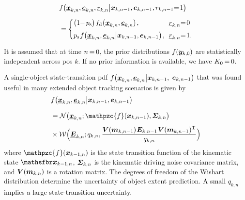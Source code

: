 \documentclass[10pt, twoside, romanappendices]{IEEEtran}
\providecommand{\rd}{\textcolor{black}}
\providecommand{\ist}{\hspace*{.3mm}}
\providecommand{\rmv}{\hspace*{-.3mm}}
\providecommand{\nn}{\nonumber}
\newcommand{\T}{\text{T}}
\begin{document}
\begin{align}
&f\big( \underline{\V{x}}_{k,n},  \underline{\V{e}}_{k,n}, \underline{r}_{k,n} \big| \V{x}_{k,n-1}, \V{e}_{k,n-1}, r_{k,n-1} \!\rmv=\! 1 \big) \nn\\[1.5mm]
&\hspace{0mm}=  
   \begin{cases}
		\big( 1 \!\rmv-\rmv p_{\mathrm{s}} \big) \ist f_{\mathrm{d}}\big( \underline{\V{x}}_{k,n}, \underline{\V{e}}_{k,n} \big) \ist, & \!\!\underline{r}_{k,n} \!\rmv=\! 0 \\[1.5mm] 
		p_{\mathrm{s}} \ist f\big( \underline{\V{x}}_{k,n}, \underline{\V{e}}_{k,n} \big| \V{x}_{k,n-1}, \V{e}_{k,n-1}\big) \ist, & \!\!\underline{r}_{k,n} \!\rmv=\! 1.
   \end{cases} \label{eq:singleTargetStateTrans_1}\\[-.5mm]
    \nn\\[-9.5mm]
\nn
\end{align}
It is assumed that at time $n \rmv=\rmv 0$, the prior distributions $f(\bm{y}_{k,0})$ are statistically independent across \acp{po} $k$. If no prior information is available, we have $K_0 \rmv=\rmv 0$.

A single-object state-transition pdf $f\big( \underline{\bm{x}}_{k,n}, \underline{\bm{e}}_{k,n} \big| \bm{x}_{k,n-1},$ $\bm{e}_{k,n-1}\big)$ that was found useful in many extended object tracking scenarios is given by \cite{GraOrg:J14a} 
\begin{align}
& f\big( \underline{\V{x}}_{k,n},  \underline{\V{e}}_{k,n} \big|\V{x}_{k,n-1}, \V{e}_{k,n-1} \big) \nn\\[2.5mm]
&= \Set{N}\big(\underline{\V{x}}_{k,n}; \mathpzc{f}(\V{x}_{k,n-1}), \M{\Sigma}_{k,n} \big) \ist \nn\\[1.5mm]
&\hspace{0mm}\times \Set{W}\Big(\underline{\M{E}}_{k,n}; q_{k,n},\frac{ \M{V}(\V{m}_{k,n-1}) \ist \M{E}_{k,n-1} \ist \M{V}(\V{m}_{k,n-1})^{\T}}{q_{k,n}}  \Big) \label{eq:stateTransition}
\end{align}
where $\mathpzc{f}(\V{x}_{k-1,n})$ is the state transition function of the kinematic state $\RV{x}_{k-1,n}$, $\M{\Sigma}_{k,n}$ is the kinematic driving noise covariance matrix, and $\M{V}(\V{m}_{k,n})$ is a rotation matrix. The degrees of freedom of the Wishart distribution determine the uncertainty of object extent prediction. \rd{A small $q_{k,n}$ implies a large state-transition \vspace{-3mm} uncertainty.}
\end{document}
